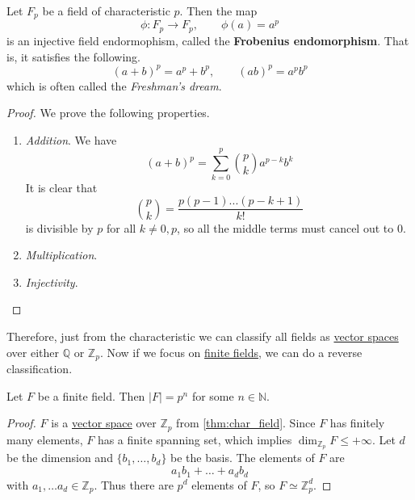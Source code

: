   \begin{definition}
    \label{def:frobenius-endomorphism}
    Let $F_p$ be a field of characteristic $p$. Then the map 
    \begin{equation}
      \phi: F_p \to F_p, \qquad \phi(a) = a^p
    \end{equation}
    is an injective field endormophism, called the \textbf{Frobenius endomorphism}. That is, it satisfies the following. 
    \begin{equation}
      (a + b)^p = a^p + b^p, \qquad (ab)^p = a^p b^p
    \end{equation}
    which is often called the \textit{Freshman's dream}. 
  \end{definition}
  \begin{proof}
    We prove the following properties. 
    \begin{enumerate}
      \item \textit{Addition}. We have 
      \begin{equation}
        (a + b)^p = \sum_{k = 0}^p \binom{p}{k} a^{p-k} b^{k}
      \end{equation}
      It is clear that 
      \begin{equation}
        \binom{p}{k} = \frac{p (p-1) ... (p - k+1)}{k!}
      \end{equation}
      is divisible by $p$ for all $k \neq 0, p$, so all the middle terms must cancel out to $0$. 

      \item \textit{Multiplication}. 

      \item \textit{Injectivity}. 
    \end{enumerate}
  \end{proof}

  Therefore, just from the characteristic we can classify all fields as \hyperref[def:vector-space]{vector spaces} over either $\mathbb{Q}$ or $\mathbb{Z}_p$. Now if we focus on \hyperref[thm:finite-fields]{finite fields}, we can do a reverse classification. 

  \begin{theorem}
    \label{thm:finite-fields-have-cardinality-pd}
    Let $F$ be a finite field. Then $|F| = p^n$ for some $n \in \mathbb{N}$. 
  \end{theorem}
  \begin{proof}
    $F$ is a \hyperref[def:vector-space]{vector space} over $\mathbb{Z}_p$ from \ref{thm:char_field}. Since $F$ has finitely many elements, $F$ has a finite spanning set, which implies $\dim_{\mathbb{Z}_p} F \leq + \infty$. Let $d$ be the dimension and $\{b_1, \ldots, b_d\}$ be the basis. The elements of $F$ are 
    \begin{equation}
      a_1 b_1 + \ldots + a_d b_d
    \end{equation}
    with $a_1, \ldots a_d \in \mathbb{Z}_p$. Thus there are $p^d$ elements of $F$, so $F \simeq \mathbb{Z}_p^d$. 
  \end{proof}

